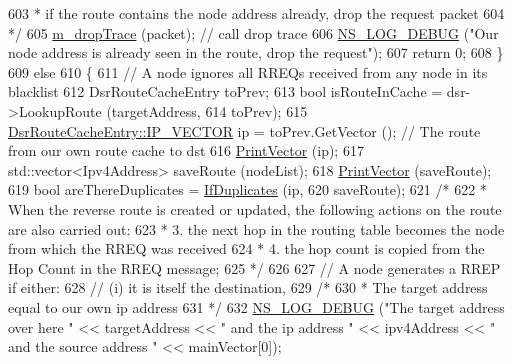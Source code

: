 \begin{DoxyCode}
603 \textcolor{comment}{       * if the route contains the node address already, drop the request packet}
604 \textcolor{comment}{       */}
605       \hyperlink{classns3_1_1dsr_1_1DsrOptions_a176bbc9efb58b6d750c14b9b03c525c4}{m\_dropTrace} (packet);    \textcolor{comment}{// call drop trace}
606       \hyperlink{group__logging_ga413f1886406d49f59a6a0a89b77b4d0a}{NS\_LOG\_DEBUG} (\textcolor{stringliteral}{"Our node address is already seen in the route, drop the request"});
607       \textcolor{keywordflow}{return} 0;
608     \}
609   \textcolor{keywordflow}{else}
610     \{
611       \textcolor{comment}{// A node ignores all RREQs received from any node in its blacklist}
612       DsrRouteCacheEntry toPrev;
613       \textcolor{keywordtype}{bool} isRouteInCache = dsr->LookupRoute (targetAddress,
614                                               toPrev);
615       \hyperlink{classns3_1_1dsr_1_1DsrRouteCacheEntry_ab834177006bdbfd2e3fa607c2a88cbdf}{DsrRouteCacheEntry::IP\_VECTOR} ip = toPrev.GetVector (); \textcolor{comment}{// The route
       from our own route cache to dst}
616       \hyperlink{classns3_1_1dsr_1_1DsrOptions_a44ae8e58769880ec9c0150bb28652350}{PrintVector} (ip);
617       std::vector<Ipv4Address> saveRoute (nodeList);
618       \hyperlink{classns3_1_1dsr_1_1DsrOptions_a44ae8e58769880ec9c0150bb28652350}{PrintVector} (saveRoute);
619       \textcolor{keywordtype}{bool} areThereDuplicates = \hyperlink{classns3_1_1dsr_1_1DsrOptions_a46fdbfab9423d644ad211c55b32ed74d}{IfDuplicates} (ip,
620                                               saveRoute);
621       \textcolor{comment}{/*}
622 \textcolor{comment}{       *  When the reverse route is created or updated, the following actions on the route are also carried
       out:}
623 \textcolor{comment}{       *  3. the next hop in the routing table becomes the node from which the  RREQ was received}
624 \textcolor{comment}{       *  4. the hop count is copied from the Hop Count in the RREQ message;}
625 \textcolor{comment}{       */}
626 
627       \textcolor{comment}{//  A node generates a RREP if either:}
628       \textcolor{comment}{//  (i)  it is itself the destination,}
629       \textcolor{comment}{/*}
630 \textcolor{comment}{       * The target address equal to our own ip address}
631 \textcolor{comment}{       */}
632       \hyperlink{group__logging_ga413f1886406d49f59a6a0a89b77b4d0a}{NS\_LOG\_DEBUG} (\textcolor{stringliteral}{"The target address over here "} << targetAddress << \textcolor{stringliteral}{" and the ip address "} 
      << ipv4Address << \textcolor{stringliteral}{" and the source address "} << mainVector[0]);

\end{DoxyCode}
